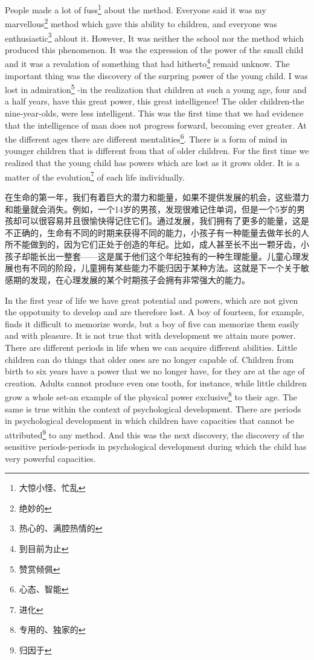 \documentclass[lang=cn,10pt]{elegantbook}
\begin{document}
People made a lot of fuss\footnote{大惊小怪、忙乱} about the method. Everyone said it was my marvellous\footnote{绝妙的} method which gave this ability to children, and everyone was enthusiastic\footnote{热心的、满腔热情的} ablout it. However, It was neither the school nor the method which produced this phenomenon. It was the expression of the power of the small child and it was a revalation of something that had hitherto\footnote{到目前为止} remaid unknow. The important thing was the discovery of the surpring power of the young child. I was lost in admiration\footnote{赞赏倾佩} -in the realization that children at such a young age, four and a half years, have this great power, this great intelligence! The older children-the nine-year-olds, were less intelligent. This was the first time that we had evidence that the intelligence of man does not progress forward, becoming ever greater. At the different ages there are different mentalities\footnote{心态、智能}. There is a form of mind in younger children that is different from that of older children. For the first time we realized that the young child has powers which are lost as it grows older. It is a matter of the evolution\footnote{进化} of each life individually.

在生命的第一年，我们有着巨大的潜力和能量，如果不提供发展的机会，这些潜力和能量就会消失。例如，一个14岁的男孩，发现很难记住单词，但是一个5岁的男孩却可以很容易并且很愉快得记住它们。通过发展，我们拥有了更多的能量，这是不正确的，生命有不同的时期来获得不同的能力，小孩子有一种能量去做年长的人所不能做到的，因为它们正处于创造的年纪。比如，成人甚至长不出一颗牙齿，小孩子却能长出一整套——这是属于他们这个年纪独有的一种生理能量。儿童心理发展也有不同的阶段，儿童拥有某些能力不能归因于某种方法。这就是下一个关于敏感期的发现，在心理发展的某个时期孩子会拥有非常强大的能力。

In the first year of life we have great potential and powers, which are not given the oppotunity to develop and are therefore lost. A boy of fourteen, for example, finds it difficult to memorize words, but a boy of five can memorize them easily and with pleasure. It is not true that with development we attain more power. There are different periods in life when we can acquire different abilities. Little children can do things that older ones are no longer capable of. Children from birth to six years have a power that we no longer have, for they are at the age of creation. Adults cannot produce even one tooth, for instance, while little children grow a whole set-an example of the physical power exclusive\footnote{专用的、独家的} to their age. The same is true within the context of psychological development. There are periods in psychological development in which children have capacities that cannot be attributed\footnote{归因于} to any method. And this was the next discovery, the discovery of the sensitive periods-periods in psychological development during which the child has very powerful capacities.
\end{document}
